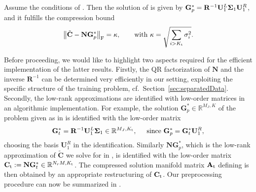 \documentclass[onefignum,onetabnum]{siamart251104}
\newcommand{\bt}[1]{{\mathbf{#1}}}
\newcommand{\thi}[1]{{{#1}_{\rm{t}}}}	%
\newcommand{\Nr}{{N_r}}
\newcommand{\R}{\mathbb{R}}
\newcommand{\Ap}{{\bt{A}}}
\newcommand{\Cp}{{\bt{C}}}
\begin{document}
\begin{crllr}\label{cor:err-truncSVD}
Assume the conditions of . Then the solution of   is given by $\bt{G}^*_p = \bt{R}^{-1} \bt{U}_1^L \bold{\Sigma}_1 \bt{U}_1^R$, and it fulfills the compression bound
\begin{align*}
	\left \| \tilde{\Cp} - \bt{N} {\bt{G}}_p^* \right\|_{\rm{F}} = \kappa, \qquad \text{with } \kappa = \sqrt{\sum_{i> \thi{K}} \sigma_i^2 }.
\end{align*}
\end{crllr}
Before proceeding, we would like to highlight two aspects required for the efficient implementation of the latter results. Firstly, the QR factorization of $\bt{N}$ and the inverse $\bt{R}^{-1}$ can be determined very efficiently in our setting, exploiting the specific structure of the training problem, cf.~Section~\ref{sec:separatedData}. 
%
Secondly, the low-rank approximations are identified with low-order matrices in an algorithmic implementation. For example, the solution $\bt{G}_p^*\in\R^{M_J,K}$ of the problem given as in  is identified with the low-order matrix 
\begin{align}\label{eq:Gt-trunc}
\bt{G}_t^* =  \bt{R}^{-1} \bt{U}_1^L \bold{\Sigma}_1  \in\R^{M_J,\thi{K}}, \hspace{0.5cm} \text{since } \bt{G}_p^* = \bt{G}_t^*  \bt{U}_1^R,
\end{align}
choosing the basis $\bt{U}_1^R$ in the identification. Similarly $\bt{N} \bt{G}_p^*$, which is the low-rank approximation of $\tilde{\Cp}$ we solve for in , is identified with the low-order matrix $\thi{\Cp} := \bt{N} \bt{G}_t^* \in \R^{\Nr M, \thi{K}}$. The compressed solution manifold matrix $\thi{\Ap}$ defining  is then obtained by an appropriate restructuring of $\thi{\Cp}$.
Our preprocessing procedure can now be summarized in .
\end{document}
